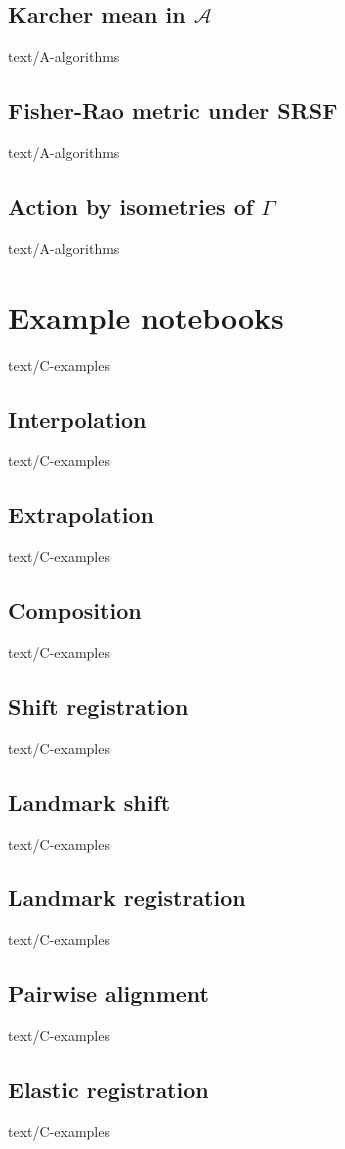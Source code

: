 \documentclass[epsbased,copyleft,final,loe, lof,extendedindex,firstnumbered,tfg,english]{tfgtfmthesisuam}
\begin{document}
  \section{Karcher mean in $\mathcal{A}$\label{SEC:KARCHERA}}{text/A-algorithms}
  \section{Fisher-Rao metric under SRSF\label{SEC:MAPPING}}{text/A-algorithms}
  \section{Action by isometries of $\Gamma$\label{SEC:ACTION}}{text/A-algorithms}


\chapter{Example notebooks\label{CAP:EXAMPLES}}{text/C-examples}
	\section{Interpolation\label{EX:INTERPOLATION}}{text/C-examples}
	\section{Extrapolation\label{EX:EXTRAPOLATION}}{text/C-examples}
	\section{Composition\label{EX:COMPOSITION}}{text/C-examples}
	\section{Shift registration\label{EX:SHIFT}}{text/C-examples}
	\section{Landmark shift\label{EX:LANDSHIFT}}{text/C-examples}
	\section{Landmark registration\label{EX:LANDMARKREG}}{text/C-examples}
	\section{Pairwise alignment\label{EX:PAIRWISE}}{text/C-examples}
	\section{Elastic registration\label{EX:ELASTIC}}{text/C-examples}
\end{document}
